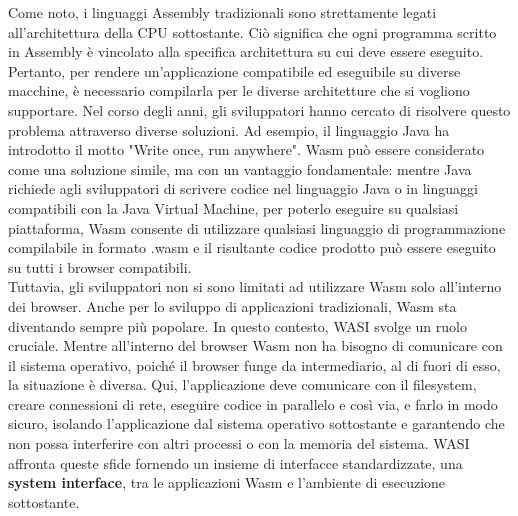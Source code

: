 Come noto, i linguaggi Assembly tradizionali sono strettamente legati all'architettura della CPU sottostante. Ciò significa che ogni programma scritto in Assembly è vincolato alla specifica architettura su cui deve essere eseguito. Pertanto, per rendere un'applicazione compatibile ed eseguibile su diverse macchine, è necessario compilarla per le diverse architetture che si vogliono supportare.
Nel corso degli anni, gli sviluppatori hanno cercato di risolvere questo problema attraverso diverse soluzioni. Ad esempio, il linguaggio Java ha introdotto il motto "Write once, run anywhere". Wasm può essere considerato come una soluzione simile, ma con un vantaggio fondamentale: mentre Java richiede agli sviluppatori di scrivere codice nel linguaggio Java o in linguaggi compatibili con la Java Virtual Machine, per poterlo eseguire su qualsiasi piattaforma, Wasm consente di utilizzare qualsiasi linguaggio di programmazione compilabile in formato .wasm e il risultante codice prodotto può essere eseguito su tutti i browser compatibili.
\\
Tuttavia, gli sviluppatori non si sono limitati ad utilizzare Wasm solo all'interno dei browser. Anche per lo sviluppo di applicazioni tradizionali, Wasm sta diventando sempre più popolare.
In questo contesto, WASI svolge un ruolo cruciale. Mentre all'interno del browser Wasm non ha bisogno di comunicare con il sistema operativo, poiché il browser funge da intermediario, al di fuori di esso, la situazione è diversa. Qui, l'applicazione deve comunicare con il filesystem, creare connessioni di rete, eseguire codice in parallelo e così via, e farlo in modo sicuro, isolando l'applicazione dal sistema operativo sottostante e garantendo che non possa interferire con altri processi o con la memoria del sistema. WASI affronta queste sfide fornendo un insieme di interfacce standardizzate, una \textbf{system interface}, tra le applicazioni Wasm e l'ambiente di esecuzione sottostante.
\clearpage
